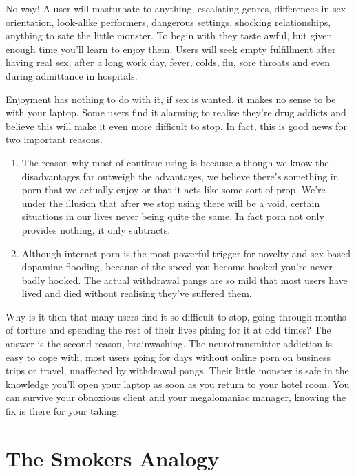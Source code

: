 \documentclass[
]{book}
\begin{document}
No way! A user will masturbate to anything, escalating genres, differences in sex-orientation, look-alike performers, dangerous settings, shocking relationships, anything to sate the little monster. To begin with they taste awful, but given enough time you'll learn to enjoy them. Users will seek empty fulfillment after having real sex, after a long work day, fever, colds, flu, sore throats and even during admittance in hospitals.

Enjoyment has nothing to do with it, if sex is wanted, it makes no sense to be with your laptop. Some users find it alarming to realise they're drug addicts and believe this will make it even more difficult to stop. In fact, this is good news for two important reasons.

\begin{enumerate}
\def\labelenumi{\arabic{enumi}.}
\item
  The reason why most of continue using is because although we know the disadvantages far outweigh the advantages, we believe there's something in porn that we actually enjoy or that it acts like some sort of prop. We're under the illusion that after we stop using there will be a void, certain situations in our lives never being quite the same. In fact porn not only provides nothing, it only subtracts.
\item
  Although internet porn is the most powerful trigger for novelty and sex based dopamine flooding, because of the speed you become hooked you're never badly hooked. The actual withdrawal pangs are so mild that most users have lived and died without realising they've suffered them.
\end{enumerate}

Why is it then that many users find it so difficult to stop, going through months of torture and spending the rest of their lives pining for it at odd times? The answer is the second reason, brainwashing. The neurotransmitter addiction is easy to cope with, most users going for days without online porn on business trips or travel, unaffected by withdrawal pangs. Their little monster is safe in the knowledge you'll open your laptop as soon as you return to your hotel room. You can survive your obnoxious client and your megalomaniac manager, knowing the fix is there for your taking.

\hypertarget{the-smokers-analogy}{%
\section{The Smokers Analogy}\label{the-smokers-analogy}}
\end{document}
